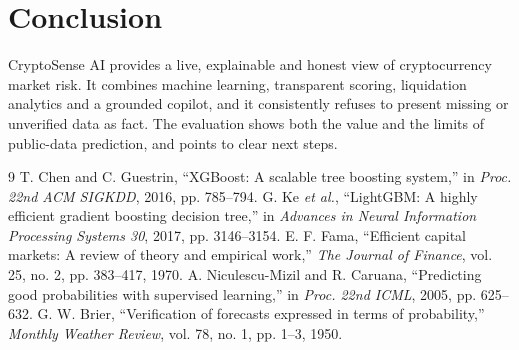 \documentclass[11pt,a4paper]{article}
\begin{document}
\section{Conclusion}
CryptoSense AI provides a live, explainable and honest view of cryptocurrency market risk. It combines machine learning, transparent scoring, liquidation analytics and a grounded copilot, and it consistently refuses to present missing or unverified data as fact. The evaluation shows both the value and the limits of public-data prediction, and points to clear next steps.

\begin{thebibliography}{9}
 T. Chen and C. Guestrin, ``XGBoost: A scalable tree boosting system,'' in \textit{Proc. 22nd ACM SIGKDD}, 2016, pp. 785--794.
 G. Ke \textit{et al.}, ``LightGBM: A highly efficient gradient boosting decision tree,'' in \textit{Advances in Neural Information Processing Systems 30}, 2017, pp. 3146--3154.
 E. F. Fama, ``Efficient capital markets: A review of theory and empirical work,'' \textit{The Journal of Finance}, vol. 25, no. 2, pp. 383--417, 1970.
 A. Niculescu-Mizil and R. Caruana, ``Predicting good probabilities with supervised learning,'' in \textit{Proc. 22nd ICML}, 2005, pp. 625--632.
 G. W. Brier, ``Verification of forecasts expressed in terms of probability,'' \textit{Monthly Weather Review}, vol. 78, no. 1, pp. 1--3, 1950.
\end{thebibliography}
\end{document}
